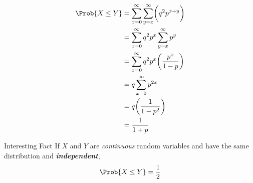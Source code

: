 \begin{Example}{}{}
\begin{enumerate}[label=(\roman*)]
              \begin{align*}
                  \Prob{X\le Y}
                   & =
                  \sum\limits_{x=0}^{\infty}
                  \sum\limits_{y=x}^{\infty}\biggl( q^2 p^{x+y} \biggr) \\
                   & =\sum\limits_{x=0}^{\infty} q^2p^x
                  \sum\limits_{y=x}^{\infty} p^y                        \\
                   & =\sum\limits_{x=0}^{\infty}
                  q^2p^x\biggl( \frac{p^x}{1-p}  \biggr)                \\
                   & =q\sum\limits_{x=0}^{\infty} p^{2x}                \\
                   & =q\biggl( \frac{1}{1-p^2}  \biggr)                 \\
                   & =\frac{1}{1+p}
              \end{align*}

    \end{enumerate}
\end{Example}
\begin{Remark}{Interesting Fact}{}
    If $ X $ and $ Y $ are \emph{continuous} random variables
    and have the same distribution and \emph{\textbf{independent}},
    \[ \Prob{X\le Y}=\frac{1}{2} \]
\end{Remark}
